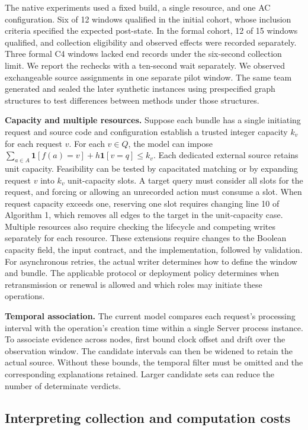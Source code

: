 The native experiments used a fixed build, a single resource, and one AC configuration. Six of 12 windows qualified in the initial cohort, whose inclusion criteria specified the expected post-state. In the formal cohort, 12 of 15 windows qualified, and collection eligibility and observed effects were recorded separately. Three formal C4 windows lacked end records under the six-second collection limit. We report the rechecks with a ten-second wait separately. We observed exchangeable source assignments in one separate pilot window. The same team generated and sealed the later synthetic instances using prespecified graph structures to test differences between methods under those structures.

\textbf{Capacity and multiple resources.} Suppose each bundle has a single initiating request and source code and configuration establish a trusted integer capacity \(k_v\) for each request \(v\). For each \(v\in Q\), the model can impose \(\sum_{a\in A}\mathbf{1}[f(a)=v]+h\mathbf{1}[v=q]\leq k_v\). Each dedicated external source retains unit capacity. Feasibility can be tested by capacitated matching or by expanding request \(v\) into \(k_v\) unit-capacity slots. A target query must consider all slots for the request, and forcing or allowing an unrecorded action must consume a slot. When request capacity exceeds one, reserving one slot requires changing line 10 of Algorithm 1, which removes all edges to the target in the unit-capacity case. Multiple resources also require checking the lifecycle and competing writes separately for each resource. These extensions require changes to the Boolean capacity field, the input contract, and the implementation, followed by validation. For asynchronous retries, the actual writer determines how to define the window and bundle. The applicable protocol or deployment policy determines when retransmission or renewal is allowed and which roles may initiate these operations.

\textbf{Temporal association.} The current model compares each request's processing interval with the operation's creation time within a single Server process instance. To associate evidence across nodes, first bound clock offset and drift over the observation window. The candidate intervals can then be widened to retain the actual source. Without these bounds, the temporal filter must be omitted and the corresponding explanations retained. Larger candidate sets can reduce the number of determinate verdicts.

\subsection{Interpreting collection and computation costs}\label{interpreting-collection-and-computation-costs}

